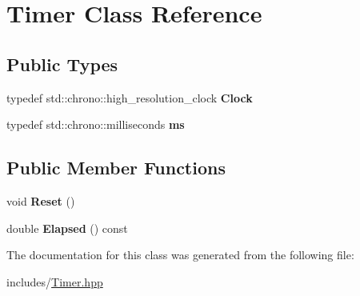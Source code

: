 \hypertarget{class_timer}{}\section{Timer Class Reference}
\label{class_timer}
\subsection*{Public Types}
\begin{DoxyCompactItemize}
\item 
\mbox{\label{class_timer_ab6fc5ea7e1e1e2e3cfa79f8c7cc7005e}} 
typedef std\+::chrono\+::high\+\_\+resolution\+\_\+clock {\bfseries Clock}
\item 
\mbox{\label{class_timer_a6840bc0fb5c4764ac55fa693a52bf861}} 
typedef std\+::chrono\+::milliseconds {\bfseries ms}
\end{DoxyCompactItemize}
\subsection*{Public Member Functions}
\begin{DoxyCompactItemize}
\item 
\mbox{\label{class_timer_ae7c0c1e7d12de4b8a6e7c64e451cdd2a}} 
void {\bfseries Reset} ()
\item 
\mbox{\label{class_timer_a23ceb8d8848ca88a46a5df2b07e27516}} 
double {\bfseries Elapsed} () const
\end{DoxyCompactItemize}


The documentation for this class was generated from the following file\+:\begin{DoxyCompactItemize}
\item 
includes/\hyperlink{_timer_8hpp}{Timer.\+hpp}\end{DoxyCompactItemize}
